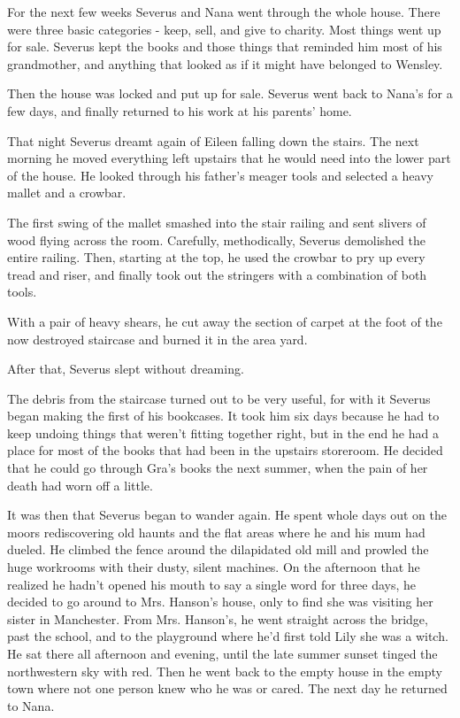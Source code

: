 \documentclass[a4paper,11pt]{article}
\begin{document}
For the next few weeks Severus and Nana went through the whole house. There were three basic categories - keep, sell, and give to charity. Most things went up for sale. Severus kept the books and those things that reminded him most of his grandmother, and anything that looked as if it might have belonged to Wensley.

Then the house was locked and put up for sale. Severus went back to Nana's for a few days, and finally returned to his work at his parents' home.

That night Severus dreamt again of Eileen falling down the stairs. The next morning he moved everything left upstairs that he would need into the lower part of the house. He looked through his father's meager tools and selected a heavy mallet and a crowbar.

The first swing of the mallet smashed into the stair railing and sent slivers of wood flying across the room. Carefully, methodically, Severus demolished the entire railing. Then, starting at the top, he used the crowbar to pry up every tread and riser, and finally took out the stringers with a combination of both tools.

With a pair of heavy shears, he cut away the section of carpet at the foot of the now destroyed staircase and burned it in the area yard.

After that, Severus slept without dreaming.

The debris from the staircase turned out to be very useful, for with it Severus began making the first of his bookcases. It took him six days because he had to keep undoing things that weren't fitting together right, but in the end he had a place for most of the books that had been in the upstairs storeroom. He decided that he could go through Gra's books the next summer, when the pain of her death had worn off a little.

It was then that Severus began to wander again. He spent whole days out on the moors rediscovering old haunts and the flat areas where he and his mum had dueled. He climbed the fence around the dilapidated old mill and prowled the huge workrooms with their dusty, silent machines. On the afternoon that he realized he hadn't opened his mouth to say a single word for three days, he decided to go around to Mrs. Hanson's house, only to find she was visiting her sister in Manchester. From Mrs. Hanson's, he went straight across the bridge, past the school, and to the playground where he'd first told Lily she was a witch. He sat there all afternoon and evening, until the late summer sunset tinged the northwestern sky with red. Then he went back to the empty house in the empty town where not one person knew who he was or cared. The next day he returned to Nana.
\end{document}
